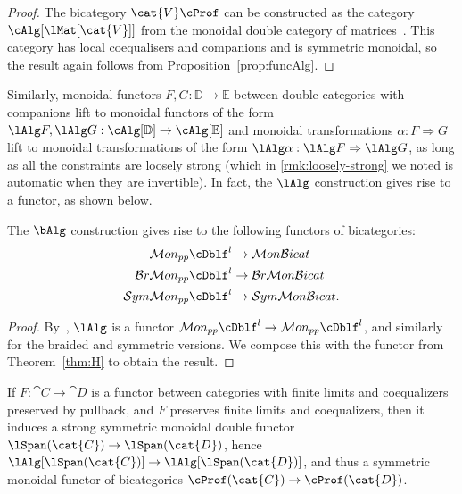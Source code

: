 \begin{proof}
The bicategory $\cat{V}\cProf$ can be constructed as the category $\cAlg[\lMat[\cat{V}]]$ from the monoidal double category of matrices~\cite[Examples 11.8]{shulman:frbi}.
This category has local coequalisers and companions and is symmetric monoidal, so the result again follows from Proposition~\ref{prop:funcAlg}.
\end{proof}

Similarly, monoidal functors $F,G:\mathbb{D} \rightarrow \mathbb{E}$ between double categories with companions lift to monoidal functors of the form $\lAlg F,\lAlg G: \cAlg[\mathbb{D}] \rightarrow \cAlg[\mathbb{E}]$ and monoidal transformations $\alpha: F \Rightarrow G$ lift to monoidal transformations of the form $\lAlg\alpha: \lAlg F \Rightarrow \lAlg G$, as long as all the constraints are loosely strong (which in \autoref{rmk:loosely-strong} we noted is automatic when they are invertible). In fact, the $\lAlg$ construction gives rise to a functor, as shown below. 

\begin{prop}\label{prop:funcAlg}
The $\bAlg$ construction gives rise to the following functors of bicategories:
\begin{align*}
\mathcal{M}on_{pp}\cDblf^l &\rightarrow \mathcal{M}on\mathcal{B}icat\\
\mathcal{B}r\mathcal{M}on_{pp}\cDblf^l &\rightarrow \mathcal{B}r\mathcal{M}on\mathcal{B}icat\\
\mathcal{S}ym\mathcal{M}on_{pp}\cDblf^l &\rightarrow \mathcal{S}ym\mathcal{M}on\mathcal{B}icat.
\end{align*}
\end{prop}
\begin{proof}
By~\cite[Proposition 11.22]{shulman:frbi}, $\lAlg$ is a functor $\mathcal{M}on_{pp}\cDblf^l \rightarrow \mathcal{M}on_{pp} \cDblf^l$, and similarly for the braided and symmetric versions. We compose this with the functor from Theorem~\ref{thm:H} to obtain the result.
\end{proof}

\begin{eg}\label{thm:span-functor}
  If $F:\cat{C}\to\cat{D}$ is a functor between categories with finite limits and coequalizers preserved by pullback, and $F$ preserves finite limits and coequalizers, then it induces a strong symmetric monoidal double functor $\lSpan(\cat{C}) \to \lSpan(\cat{D})$, hence $\lAlg[\lSpan(\cat{C})] \to \lAlg[\lSpan(\cat{D})]$, and thus a symmetric monoidal functor of bicategories $\cProf(\cat{C}) \to \cProf(\cat{D})$.
\end{eg}

